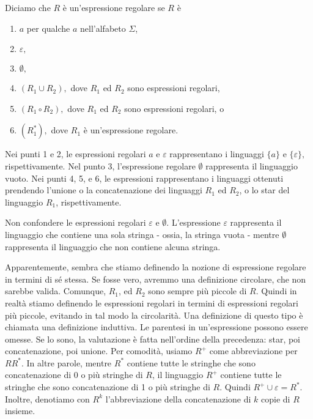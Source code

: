 \documentclass{article}
\begin{document}
\begin{tcolorbox}[colback=blue!10!white, colframe=blue!50!black, title=Definizione]
    Diciamo che $R$ è un'\textcolor{myred}{espressione regolare} se $R$ è
    \begin{enumerate}
        \item $a$ per qualche $a$ nell'alfabeto $\Sigma$,
        \item $\varepsilon,$
        \item $\emptyset,$
        \item $(R_{1}\cup R_{2}),$ dove $R_{1}$ ed $R_{2}$ sono espressioni regolari,
        \item $(R_{1}\circ R_{2}),$ dove $R_{1}$ ed $R_{2}$ sono espressioni regolari, o
        \item $(R^*_{1}),$ dove $R_{1}$ è un'espressione regolare.
    \end{enumerate}

    Nei punti 1 e 2, le espressioni regolari $a$ e $\varepsilon$ rappresentano i linguaggi $\{a\}$ e $\{\varepsilon\},$ rispettivamente. Nel punto 3, l'espressione regolare $\emptyset$ rappresenta il linguaggio vuoto. Nei punti 4, 5, e 6, le espressioni rappresentano i linguaggi ottenuti prendendo l'unione o la concatenazione dei linguaggi $R_{1}$ ed $R_{2}$, o lo star del linguaggio $R_1$, rispettivamente.
\end{tcolorbox}

\begin{tcolorbox}[colback=red!10!white, colframe=red!50!black, title=ATTENZIONE!]
    Non confondere le espressioni regolari $\varepsilon \text{ e } \emptyset.$ L'espressione $\varepsilon$ rappresenta il linguaggio che contiene una sola stringa - ossia, la stringa vuota - mentre $\emptyset$ rappresenta il linguaggio che non contiene alcuna stringa.
\end{tcolorbox}

Apparentemente, sembra che stiamo definendo la nozione di espressione regolare in termini di sé stessa. Se fosse vero, avremmo una definizione circolare, che non sarebbe valida. Comunque, $R_{1}$, ed $R_{2}$ sono sempre più piccole di $R$. Quindi in realtà stiamo definendo le espressioni regolari in termini di espressioni regolari più piccole, evitando in tal modo la circolarità. Una definizione di questo tipo è chiamata una \textcolor{myred}{definizione induttiva}.
\vspace{1em}
\text{}
\newline
Le parentesi in un'espressione possono essere omesse. Se lo sono, la valutazione è fatta nell'ordine della precedenza: star, poi concatenazione, poi unione.
Per comodità, usiamo $R^{+}$ come abbreviazione per $RR^{*}$. In altre parole, mentre $R^{*}$ contiene tutte le stringhe che sono concatenazione di 0 o più stringhe di $R$, il linguaggio $R^{+}$ contiene tutte le stringhe che sono concatenazione di 1 o più stringhe di $R$. Quindi $R^{+}\cup \varepsilon = R^{*}$. Inoltre, denotiamo con $R^{k}$ l'abbreviazione della concatenazione di $k$ copie di $R$ insieme.
\end{document}
